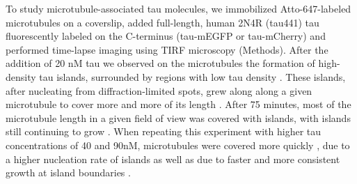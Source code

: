 To study microtubule-associated tau molecules, we immobilized Atto-647-labeled microtubules on a coverslip, added full-length, human 2N4R (tau441) tau fluorescently labeled on the C-terminus (tau-mEGFP or tau-mCherry) and performed time-lapse imaging using TIRF microscopy (Methods). After the addition of 20 nM tau we observed on the microtubules the formation of high-density tau islands, surrounded by regions with low tau density . These islands, after nucleating from diffraction-limited spots, grew along along a given microtubule to cover more and more of its length . After 75 minutes, most of the microtubule length in a given field of view was covered with islands, with islands still continuing to grow . When repeating this experiment with higher tau concentrations of 40 and 90nM, microtubules were covered more quickly , due to a higher nucleation rate of islands  as well as due to faster and more consistent growth at island boundaries . 

